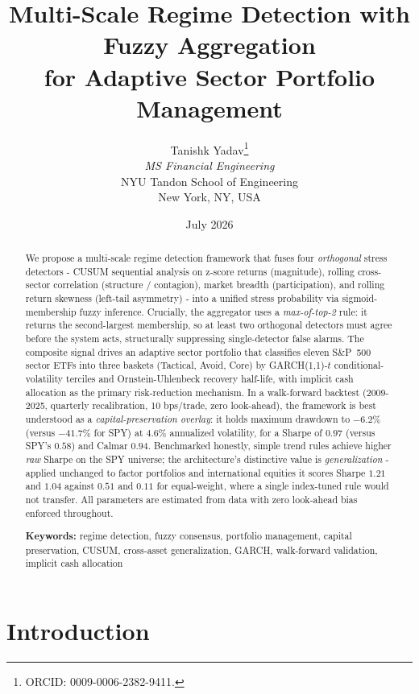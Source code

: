 \documentclass[11pt]{article}
\title{\textbf{Multi-Scale Regime Detection with Fuzzy Aggregation\\for Adaptive Sector Portfolio Management}}
\author{
Tanishk Yadav\thanks{ORCID: 0009-0006-2382-9411.}\\
\textit{MS Financial Engineering}\\
NYU Tandon School of Engineering\\
New York, NY, USA
}
\date{July 2026}
\begin{document}
\maketitle
\thispagestyle{fancy}

\begin{abstract}
\noindent
We propose a multi-scale regime detection framework that fuses four
\emph{orthogonal} stress detectors - CUSUM sequential analysis on
z-score returns (magnitude), rolling cross-sector correlation
(structure / contagion), market breadth (participation), and rolling
return skewness (left-tail asymmetry) - into a unified stress
probability via sigmoid-membership fuzzy inference. Crucially, the
aggregator uses a \emph{max-of-top-2} rule: it returns the
second-largest membership, so at least two orthogonal detectors must
agree before the system acts, structurally suppressing single-detector
false alarms. The composite signal drives an adaptive sector portfolio
that classifies eleven S\&P~500 sector ETFs into three baskets
(Tactical, Avoid, Core) by GARCH(1,1)-$t$ conditional-volatility
terciles and Ornstein-Uhlenbeck recovery half-life, with implicit cash
allocation as the primary risk-reduction mechanism. In a walk-forward
backtest (2009-2025, quarterly recalibration, 10 bps/trade, zero
look-ahead), the framework is best understood as a
\emph{capital-preservation overlay}: it holds maximum drawdown to
$-6.2\%$ (versus $-41.7\%$ for SPY) at $4.6\%$ annualized volatility,
for a Sharpe of $0.97$ (versus SPY's $0.58$) and Calmar $0.94$.
Benchmarked honestly, simple trend rules achieve higher \emph{raw}
Sharpe on the SPY universe; the architecture's distinctive value is
\emph{generalization} - applied unchanged to factor portfolios and
international equities it scores Sharpe $1.21$ and $1.04$ against
$0.51$ and $0.11$ for equal-weight, where a single index-tuned rule
would not transfer. All parameters are estimated from data with zero
look-ahead bias enforced throughout.

\medskip
\noindent\textbf{Keywords:} regime detection, fuzzy consensus, portfolio management, capital preservation, CUSUM, cross-asset generalization, GARCH, walk-forward validation, implicit cash allocation
\end{abstract}

\section{Introduction}
\end{document}
